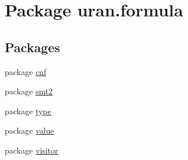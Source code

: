 \hypertarget{namespaceuran_1_1formula}{}\section{Package uran.\+formula}
\label{namespaceuran_1_1formula}
\subsection*{Packages}
\begin{DoxyCompactItemize}
\item 
package \hyperlink{namespaceuran_1_1formula_1_1cnf}{cnf}
\item 
package \hyperlink{namespaceuran_1_1formula_1_1smt2}{smt2}
\item 
package \hyperlink{namespaceuran_1_1formula_1_1type}{type}
\item 
package \hyperlink{namespaceuran_1_1formula_1_1value}{value}
\item 
package \hyperlink{namespaceuran_1_1formula_1_1visitor}{visitor}
\end{DoxyCompactItemize}
